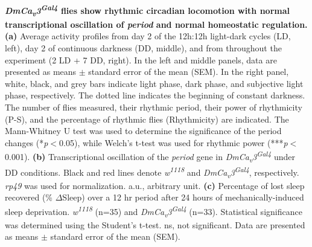 \label{fig:4}
\textbf{ \emph{DmCa\textsubscript{v}3\textsuperscript{Gal4}} flies show rhythmic circadian locomotion with normal transcriptional oscillation of \emph{period} and normal homeostatic regulation.}
\\
\textbf{(a)} Average activity profiles from day 2 of the 12h:12h light-dark cycles (LD, left), day 2 of continuous darkness (DD, middle), and from throughout the experiment (2 LD + 7 DD, right).
In the left and middle panels, data are presented as means $\pm$ standard error of the mean (SEM).
In the right panel, white, black, and grey bars indicate light phase, dark phase, and subjective light phase, respectively.
The dotted line indicates the beginning of constant darkness. 
The number of flies measured, their rhythmic period, their power of rhythmicity (P-S), and the percentage of rhythmic flies (Rhythmicity) are indicated.
The Mann-Whitney U test was used to determine the significance of the period changes (*\emph{p}$<$0.05), while Welch's t-test was used for rhythmic power (***\emph{p}$<$0.001). 
\textbf{(b)} Transcriptional oscillation of the \emph{period} gene in \emph{DmCa\textsubscript{v}3\textsuperscript{Gal4}} under DD conditions. Black and red lines denote \emph{w\textsuperscript{1118}} and \emph{DmCa\textsubscript{v}3\textsuperscript{Gal4}}, respectively.
\emph{rp49} was used for normalization.
a.u., arbitrary unit.
\textbf{(c)} Percentage of lost sleep recovered (\% $\Delta$Sleep) over a 12 hr period after 24 hours of mechanically-induced sleep deprivation. \emph{w\textsuperscript{1118}} (n=35) and \emph{DmCa\textsubscript{v}3\textsuperscript{Gal4}} (n=33). 
Statistical significance was determined using the Student's t-test. 
ns, not significant.
Data are presented as means $\pm$ standard error of the mean (SEM).
